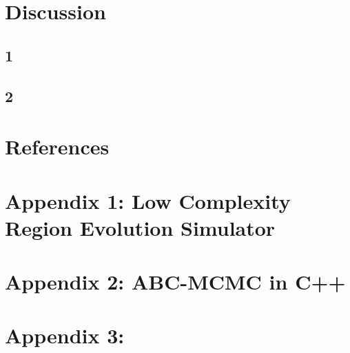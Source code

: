 \documentclass{article}
\begin{document}
\section{Discussion}



\subsection{1}

\subsection{2}

\clearpage\newpage
\section{References}


\nocite{*}
\printbibliography[heading=none, sorting=nyt]
\newpage

\section{Appendix 1: Low Complexity Region Evolution Simulator}

\newpage

\section{Appendix 2: ABC-MCMC in C++}

\newpage

\section{Appendix 3: }
\end{document}
